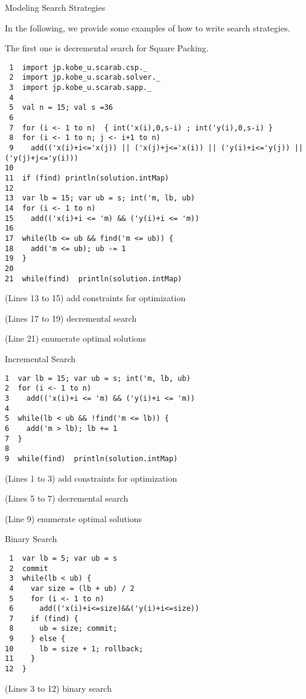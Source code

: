\documentclass[compress,dvipdfmx]{beamer}
\begin{document}
\begin{frame}[fragile,label=sec-4]{Modeling Search Strategies}
 \begin{block}{In the following, we provide some examples of how to write search strategies.}
\end{block}
\begin{block}{The first one is decremental search for Square Packing.}
\begin{verbatim}
 1  import jp.kobe_u.scarab.csp._
 2  import jp.kobe_u.scarab.solver._
 3  import jp.kobe_u.scarab.sapp._
 4  
 5  val n = 15; val s =36 
 6  
 7  for (i <- 1 to n)  { int('x(i),0,s-i) ; int('y(i),0,s-i) }
 8  for (i <- 1 to n; j <- i+1 to n) 
 9    add(('x(i)+i<='x(j)) || ('x(j)+j<='x(i)) || ('y(i)+i<='y(j)) || ('y(j)+j<='y(i)))
10  
11  if (find) println(solution.intMap) 
12  
13  var lb = 15; var ub = s; int('m, lb, ub)
14  for (i <- 1 to n)
15    add(('x(i)+i <= 'm) && ('y(i)+i <= 'm)) 
16  
17  while(lb <= ub && find('m <= ub)) {
18    add('m <= ub); ub -= 1
19  }
20  
21  while(find)  println(solution.intMap)
\end{verbatim}
\begin{block}{(Lines 13 to 15) add constraints for optimization}
\end{block}
\begin{block}{(Lines 17 to 19) decremental search}
\end{block}
\begin{block}{(Line 21) enumerate optimal solutions}
\end{block}
\end{block}

\begin{block}{Incremental Search}
\begin{verbatim}
1  var lb = 15; var ub = s; int('m, lb, ub)
2  for (i <- 1 to n)
3    add(('x(i)+i <= 'm) && ('y(i)+i <= 'm)) 
4  
5  while(lb < ub && !find('m <= lb)) {
6    add('m > lb); lb += 1
7  }
8  
9  while(find)  println(solution.intMap)
\end{verbatim}
\begin{block}{(Lines 1 to 3) add constraints for optimization}
\end{block}
\begin{block}{(Lines 5 to 7) decremental search}
\end{block}
\begin{block}{(Line 9) enumerate optimal solutions}
\end{block}
\end{block}

\begin{block}{Binary Search}
\begin{verbatim}
 1  var lb = 5; var ub = s
 2  commit
 3  while(lb < ub) {
 4    var size = (lb + ub) / 2
 5    for (i <- 1 to n)
 6      add(('x(i)+i<=size)&&('y(i)+i<=size))
 7    if (find) {
 8      ub = size; commit;
 9    } else {
10      lb = size + 1; rollback;
11    }
12  }
\end{verbatim}
\begin{block}{(Lines 3 to 12) binary search}
\end{block}
\end{block}
\end{frame}
\end{document}

